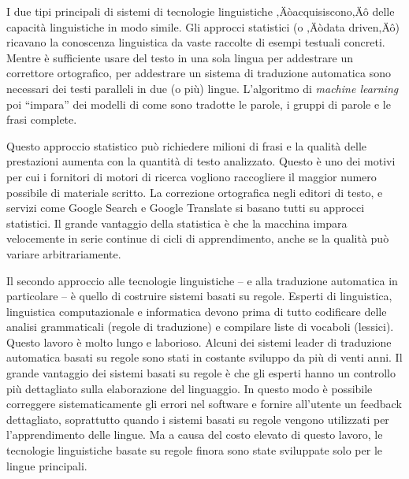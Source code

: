 \begin{multicols}{2}

I due tipi principali di sistemi di tecnologie linguistiche ‚Äòacquisiscono‚Äô delle capacit\`{a} linguistiche in modo simile. Gli approcci statistici (o ‚Äòdata driven‚Äô) ricavano la conoscenza linguistica da vaste raccolte di esempi testuali concreti. Mentre \`{e} sufficiente usare del testo in una sola lingua per addestrare un correttore ortografico, per addestrare un sistema di traduzione automatica sono necessari dei testi paralleli in due (o pi\`{u}) lingue. L'algoritmo di \textit{machine learning} poi “impara” dei modelli di come sono tradotte le parole, i gruppi di parole e le frasi complete.

Questo approccio statistico pu\`{o} richiedere milioni di frasi e la
qualit\`{a} delle prestazioni aumenta con la quantit\`{a} di testo
analizzato. Questo \`{e} uno dei motivi per cui i fornitori di motori di
ricerca vogliono raccogliere il maggior numero possibile di materiale
scritto. La correzione ortografica negli editori di testo, e servizi come
Google Search e Google Translate si basano tutti su approcci
statistici. Il grande vantaggio della statistica \`{e} che la macchina impara
velocemente in serie continue di cicli di apprendimento, anche se la
qualit\`{a} pu\`{o} variare arbitrariamente.

Il secondo approccio alle tecnologie linguistiche -- e alla traduzione
automatica in particolare -- \`{e} quello di costruire sistemi basati su
regole. Esperti di linguistica, linguistica computazionale e informatica
devono prima di tutto codificare delle analisi grammaticali (regole di
traduzione) e compilare liste di vocaboli (lessici). Questo lavoro \`{e} molto
lungo e laborioso. Alcuni dei sistemi leader di traduzione automatica basati
su regole sono stati in costante sviluppo da pi\`{u} di venti anni. Il grande
vantaggio dei sistemi basati su regole \`{e} che gli esperti hanno un controllo
pi\`{u} dettagliato sulla elaborazione del linguaggio. In questo modo \`{e}
possibile correggere sistematicamente gli errori nel software e fornire
all'utente un feedback dettagliato, soprattutto quando i sistemi basati su
regole vengono utilizzati per l'apprendimento delle lingue. Ma a causa del
costo elevato di questo lavoro, le tecnologie linguistiche basate su regole
finora sono state sviluppate solo per le lingue principali.


\end{multicols}
